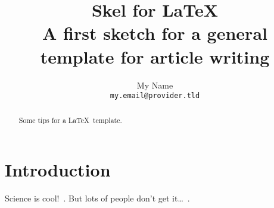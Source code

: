 \documentclass[a4paper,12pt,usenames,dvipsnames]{article}
\title{\large\textbf{
\huge Skel for \LaTeX  %
}
\\ A first sketch for a general template for article writing  %
}
\author{
My Name
\\\texttt{
my.email@provider.tld
}}
\date{}
\begin{document}
\maketitle

\begin{abstract}
  Some tips for a \LaTeX\ template.
\end{abstract}

\section{Introduction}
	Science is cool!~\cite{Sagan}. But lots of people don't get 
	it\ldots~\cite{Feynman74}. 

\printbibliography
\end{document}
